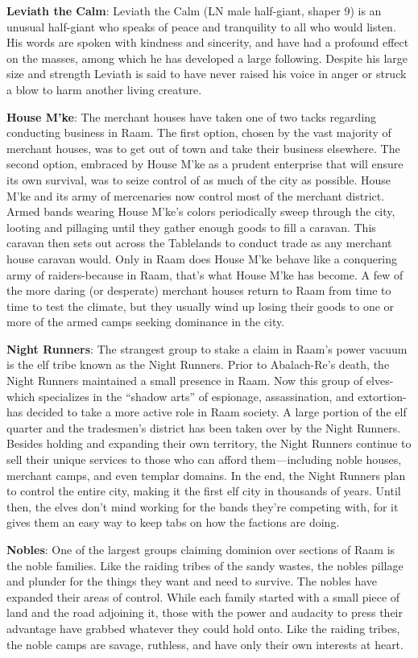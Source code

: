 {
	\textbf{Leviath the Calm}: Leviath the Calm (LN male half-giant, shaper 9) is an unusual half-giant who speaks of peace and tranquility to all who would listen. His words are spoken with kindness and sincerity, and have had a profound effect on the masses, among which he has developed a large following. Despite his large size and strength Leviath is said to have never raised his voice in anger or struck a blow to harm another living creature.

	\textbf{House M'ke}: The merchant houses have taken one of two tacks regarding conducting business in Raam. The first option, chosen by the vast majority of merchant houses, was to get out of town and take their business elsewhere. The second option, embraced by House M'ke as a prudent enterprise that will ensure its own survival, was to seize control of as much of the city as possible. House M'ke and its army of mercenaries now control most of the merchant district. Armed bands wearing House M'ke's colors periodically sweep through the city, looting and pillaging until they gather enough goods to fill a caravan. This caravan then sets out across the Tablelands to conduct trade as any merchant house caravan would. Only in Raam does House M'ke behave like a conquering army of raiders-because in Raam, that's what House M'ke has become. A few of the more daring (or desperate) merchant houses return to Raam from time to time to test the climate, but they usually wind up losing their goods to one or more of the armed camps seeking dominance in the city.

	\textbf{Night Runners}: The strangest group to stake a claim in Raam's power vacuum is the elf tribe known as the Night Runners. Prior to Abalach-Re's death, the Night Runners maintained a small presence in Raam. Now this group of elves-which specializes in the ``shadow arts'' of espionage, assassination, and extortion-has decided to take a more active role in Raam society. A large portion of the elf quarter and the tradesmen's district has been taken over by the Night Runners. Besides holding and expanding their own territory, the Night Runners continue to sell their unique services to those who can afford them---including noble houses, merchant camps, and even templar domains. In the end, the Night Runners plan to control the entire city, making it the first elf city in thousands of years. Until then, the elves don't mind working for the bands they're competing with, for it gives them an easy way to keep tabs on how the factions are doing.

	\textbf{Nobles}: One of the largest groups claiming dominion over sections of Raam is the noble families. Like the raiding tribes of the sandy wastes, the nobles pillage and plunder for the things they want and need to survive. The nobles have expanded their areas of control. While each family started with a small piece of land and the road adjoining it, those with the power and audacity to press their advantage have grabbed whatever they could hold onto. Like the raiding tribes, the noble camps are savage, ruthless, and have only their own interests at heart.

}
